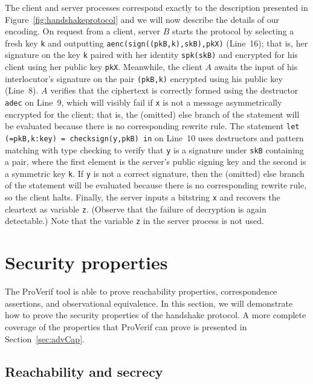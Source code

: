 \documentclass{book}
\newcommand{\A}{A}
\newcommand{\B}{B}
\begin{document}
The client and server processes correspond exactly to the description presented in Figure~\ref{fig:handshakeprotocol} and we will now describe the details of our encoding.
On request from a client, server $\B$ starts the
protocol by selecting a fresh key \lstinline!k! and outputting
\lstinline!aenc(sign((pkB,k),skB),pkX)! (Line~16); that is, her signature on the key
\lstinline!k! paired with her identity \lstinline!spk(skB)! and encrypted for his client using
her public key \lstinline!pkX!.
Meanwhile, the client $\A$ awaits the input of his interlocutor's signature
on the pair \lstinline!(pkB,k)! encrypted using his public key (Line~8). $\A$ verifies that
the ciphertext is correctly formed using the destructor \lstinline!adec! on Line~9, which
will visibly fail if \lstinline!x! is not a message asymmetrically encrypted for the client;
that is, the (omitted) else branch of the statement will be evaluated because there
is no corresponding rewrite rule.
The statement \lstinline!let (=pkB,k:key) = checksign(y,pkB) in! on Line~10 uses destructors and pattern matching with type checking to verify that \lstinline!y! is a signature under \lstinline!skB! containing a pair, where the first element is the server's public signing key and the second is a symmetric key \lstinline!k!. If \lstinline!y! is not a correct signature, then the (omitted) else branch of the statement will be evaluated because there is no corresponding rewrite rule, so the client halts.  Finally, the server inputs a bitstring \lstinline!x! and recovers the cleartext as variable \lstinline!z!. (Observe that the failure of decryption is again detectable.)
Note that the variable \lstinline!z! in the server process is not used.

\section{Security properties}\label{sec:capabilities}

The ProVerif tool is able to prove reachability properties, correspondence assertions, and observational equivalence. In this section, we will demonstrate how to prove the security properties of the handshake protocol. A more complete coverage of the properties that ProVerif can prove is presented in Section~\ref{sec:advCap}.

\subsection{Reachability and secrecy}\label{sec:basicSecrecy}
\end{document}

